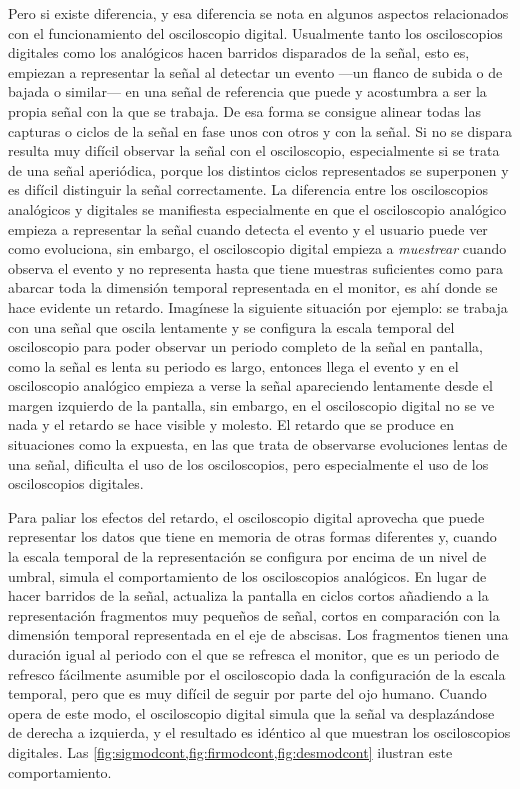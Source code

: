 Pero si existe diferencia, y esa diferencia se nota en algunos aspectos
relacionados con el funcionamiento del osciloscopio digital. Usualmente
tanto los osciloscopios digitales como los analógicos hacen barridos
disparados de la señal, esto es, empiezan a representar la señal al
detectar un evento ---un flanco de subida o de bajada o similar--- en una
señal de referencia que puede y acostumbra a ser la propia señal con la que
se trabaja. De esa forma se consigue alinear todas las capturas o ciclos de
la señal en fase unos con otros y con la señal. Si no se dispara resulta
muy difícil observar la señal con el osciloscopio, especialmente si se
trata de una señal aperiódica, porque los distintos ciclos representados se
superponen y es difícil distinguir la señal correctamente. La diferencia
entre los osciloscopios analógicos y digitales se manifiesta especialmente
en que el osciloscopio analógico empieza a representar la señal cuando
detecta el evento y el usuario puede ver como evoluciona, sin embargo, el
osciloscopio digital empieza a \emph{muestrear} cuando observa el evento y
no representa hasta que tiene muestras suficientes como para abarcar toda
la dimensión temporal representada en el monitor, es ahí donde se hace
evidente un retardo. Imagínese la siguiente situación por ejemplo: se
trabaja con una señal que oscila lentamente y se configura la escala
temporal del osciloscopio para poder observar un periodo completo de la
señal en pantalla, como la señal es lenta su periodo es largo, entonces
llega el evento y en el osciloscopio analógico empieza a verse la señal
apareciendo lentamente desde el margen izquierdo de la pantalla, sin
embargo, en el osciloscopio digital no se ve nada y el retardo se hace
visible y molesto. El retardo que se produce en situaciones como la
expuesta, en las que trata de observarse evoluciones lentas de una señal,
dificulta el uso de los osciloscopios, pero especialmente el uso de los
osciloscopios digitales.

Para paliar los efectos del retardo, el osciloscopio digital aprovecha que
puede representar los datos que tiene en memoria de otras formas diferentes
y, cuando la escala temporal de la representación se configura por encima
de un nivel de umbral, simula el comportamiento de los osciloscopios
analógicos. En lugar de hacer barridos de la señal, actualiza la pantalla
en ciclos cortos añadiendo a la representación fragmentos muy pequeños de
señal, cortos en comparación con la dimensión temporal representada en el
eje de abscisas. Los fragmentos tienen una duración igual al periodo con el
que se refresca el monitor, que es un periodo de refresco fácilmente
asumible por el osciloscopio dada la configuración de la escala temporal,
pero que es muy difícil de seguir por parte del ojo humano. Cuando opera de
este modo, el osciloscopio digital simula que la señal va desplazándose de
derecha a izquierda, y el resultado es idéntico al que muestran los
osciloscopios digitales. Las
\vref{fig:sigmodcont,fig:firmodcont,fig:desmodcont} ilustran este
comportamiento.

